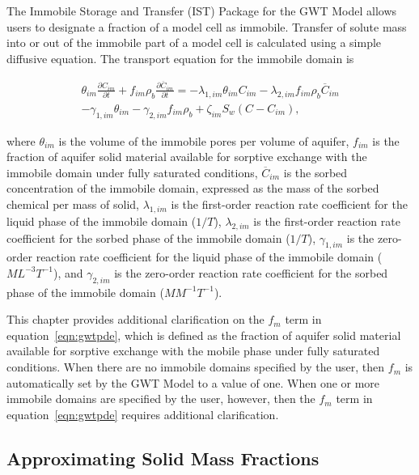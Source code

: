 The Immobile Storage and Transfer (IST) Package for the GWT Model allows users to designate a fraction of a model cell as immobile.  Transfer of solute mass into or out of the immobile part of a model cell is calculated using a simple diffusive equation.  The transport equation for the immobile domain is

\begin{equation}
\label{eqn:gwtistpde}
\begin{split}
\theta_{im} \frac{\partial C_{im} }{\partial t} + f_{im} \rho_b \frac{\partial \overline{C}_{im}}{\partial t} = 
- \lambda_{1,im} \theta_{im} C_{im} - \lambda_{2,im}  f_{im} \rho_b \overline{C}_{im} \\
- \gamma_{1,im} \theta_{im} - \gamma_{2,im} f_{im}  \rho_b 
+ \zeta_{im} S_w \left ( C - C_{im} \right ),
\end{split}
\end{equation}

\noindent where $\theta_{im}$ is the volume of the immobile pores per volume of aquifer, $f_{im}$ is the fraction of aquifer solid material available for sorptive exchange with the immobile domain under fully saturated conditions, $\overline{C}_{im}$ is the sorbed concentration of the immobile domain, expressed as the mass of the sorbed chemical per mass of solid,  $\lambda_{1,im}$ is the first-order reaction rate coefficient for the liquid phase of the immobile domain ($1/T$), $\lambda_{2,im}$ is the first-order reaction rate coefficient for the sorbed phase of the immobile domain ($1/T$), $\gamma_{1,im}$ is the zero-order reaction rate coefficient for the liquid phase of the immobile domain ($ML^{-3}T^{-1}$), and $\gamma_{2,im}$ is the zero-order reaction rate coefficient for the sorbed phase of the immobile domain ($M M^{-1}T^{-1}$).  

This chapter provides additional clarification on the $f_m$ term in equation~\ref{eqn:gwtpde}, which is defined as the fraction of aquifer solid material available for sorptive exchange with the mobile phase under fully saturated conditions.  When there are no immobile domains specified by the user, then $f_m$ is automatically set by the GWT Model to a value of one.  When one or more immobile domains are specified by the user, however, then the $f_m$ term in equation~\ref{eqn:gwtpde} requires additional clarification.

\subsection{Approximating Solid Mass Fractions} \label{sec:solidmassfrac1}

